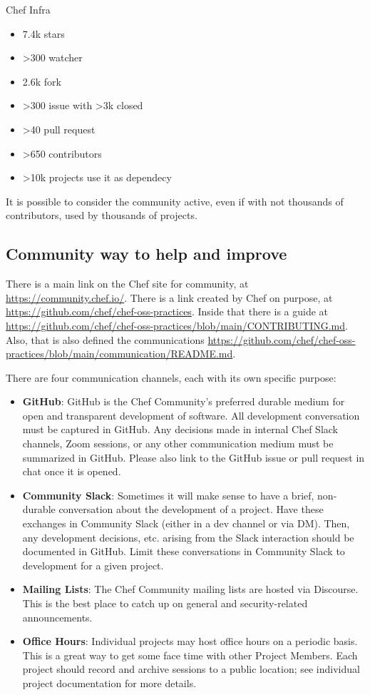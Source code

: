 \documentclass[12pt,a4paper,openright,twoside]{book}
\begin{document}
Chef Infra


\begin{itemize}
    \item 7.4k stars
    \item >300 watcher
    \item 2.6k fork
    \item >300 issue with >3k closed
    \item >40 pull request
    \item >650 contributors
    \item >10k projects use it as dependecy
\end{itemize}

It is possible to consider the community active, even if with not thousands of contributors, used by thousands of projects.


\subsection{Community way to help and improve}
There is a main link on the Chef site for community, at \url{https://community.chef.io/}.
There is a link created by Chef on purpose, at \url{https://github.com/chef/chef-oss-practices}.
Inside that there is a guide at \url{https://github.com/chef/chef-oss-practices/blob/main/CONTRIBUTING.md}.
Also, that is also defined the communications \url{https://github.com/chef/chef-oss-practices/blob/main/communication/README.md}.

There are four communication channels, each with its own specific purpose\cite{chefGithubOSSCom}:

\begin{itemize}
    \item \textbf{GitHub}: GitHub is the Chef Community's preferred durable medium for open and transparent development of software. All development conversation must be captured in GitHub. Any decisions made in internal Chef Slack channels, Zoom sessions, or any other communication medium must be summarized in GitHub. Please also link to the GitHub issue or pull request in chat once it is opened.
    \item \textbf{Community Slack}: Sometimes it will make sense to have a brief, non-durable conversation about the development of a project. Have these exchanges in Community Slack (either in a dev channel or via DM). Then, any development decisions, etc. arising from the Slack interaction should be documented in GitHub. Limit these conversations in Community Slack to development for a given project.
    \item \textbf{Mailing Lists}: The Chef Community mailing lists are hosted via Discourse. This is the best place to catch up on general and security-related announcements.
    \item \textbf{Office Hours}: Individual projects may host office hours on a periodic basis. This is a great way to get some face time with other Project Members. Each project should record and archive sessions to a public location; see individual project documentation for more details.
\end{itemize}
\end{document}
